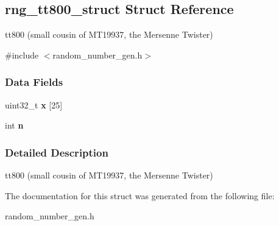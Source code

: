 \hypertarget{structrng__tt800__struct}{}\subsection{rng\+\_\+tt800\+\_\+struct Struct Reference}
\label{structrng__tt800__struct}


tt800 (small cousin of M\+T19937, the Mersenne Twister)  




{\ttfamily \#include $<$random\+\_\+number\+\_\+gen.\+h$>$}

\subsubsection*{Data Fields}
\begin{DoxyCompactItemize}
\item 
\mbox{\label{structrng__tt800__struct_ab9a57b75f7f6d7743f41c5d595a74e96}} 
uint32\+\_\+t {\bfseries x} \mbox{[}25\mbox{]}
\item 
\mbox{\label{structrng__tt800__struct_a3300fe5d7b6eae8bd0cb0edd86656860}} 
int {\bfseries n}
\end{DoxyCompactItemize}


\subsubsection{Detailed Description}
tt800 (small cousin of M\+T19937, the Mersenne Twister) 

The documentation for this struct was generated from the following file\+:\begin{DoxyCompactItemize}
\item 
random\+\_\+number\+\_\+gen.\+h\end{DoxyCompactItemize}
